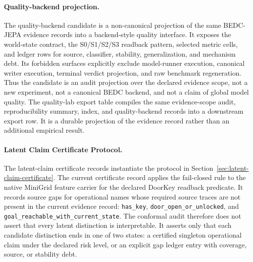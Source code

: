 \paragraph{Quality-backend projection.}
The quality-backend candidate is a non-canonical projection of the same
BEDC-JEPA evidence records into a backend-style quality interface.  It exposes
the world-state contract, the S0/S1/S2/S3 readback pattern, selected metric
cells, and ledger rows for source, classifier, stability, generalization, and
mechanism debt.  Its forbidden surfaces explicitly exclude model-runner
execution, canonical writer execution, terminal verdict projection, and raw
benchmark regeneration.  Thus the candidate is an audit projection over the
declared evidence scope, not a new experiment, not a canonical BEDC backend,
and not a claim of global model quality.
The quality-lab export table compiles the same evidence-scope audit,
reproducibility summary, index,
and quality-backend records into a downstream export row.  It is a durable
projection of the evidence record rather than an additional empirical result.

\paragraph{Latent Claim Certificate Protocol.}
The latent-claim certificate records instantiate the protocol in
Section~\ref{sec:latent-claim-certificate}.  The current certificate record
applies the fail-closed rule to the native MiniGrid feature carrier for the
declared DoorKey readback predicate.  It records source gaps for operational
names whose required source traces are not present in the current evidence
record: \texttt{has\_key}, \texttt{door\_open\_or\_unlocked}, and
\texttt{goal\_reachable\_with\_current\_state}.  The conformal audit therefore
does not assert that every latent distinction is interpretable.  It asserts
only that each candidate distinction ends in one of two states: a certified
singleton operational claim under the declared risk level, or an explicit
gap ledger entry with coverage, source, or stability debt.

